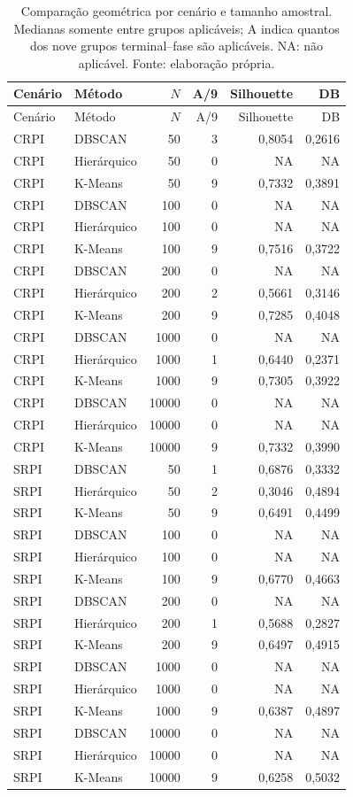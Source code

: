 \begingroup\small
\setlength{\LTpre}{0pt}
\begin{longtable}{llrrrr}
\caption{Comparação geométrica por cenário e tamanho amostral. Medianas somente entre grupos aplicáveis; A indica quantos dos nove grupos terminal--fase são aplicáveis. NA: não aplicável. Fonte: elaboração própria.}\label{tab:cluster-summary}\\
\hline Cenário & Método & $N$ & A/9 & Silhouette & DB \\
\hline\endfirsthead
\hline Cenário & Método & $N$ & A/9 & Silhouette & DB \\
\hline\endhead
CRPI & DBSCAN & 50 & 3 & 0,8054 & 0,2616 \\
CRPI & Hierárquico & 50 & 0 & NA & NA \\
CRPI & K-Means & 50 & 9 & 0,7332 & 0,3891 \\
CRPI & DBSCAN & 100 & 0 & NA & NA \\
CRPI & Hierárquico & 100 & 0 & NA & NA \\
CRPI & K-Means & 100 & 9 & 0,7516 & 0,3722 \\
CRPI & DBSCAN & 200 & 0 & NA & NA \\
CRPI & Hierárquico & 200 & 2 & 0,5661 & 0,3146 \\
CRPI & K-Means & 200 & 9 & 0,7285 & 0,4048 \\
CRPI & DBSCAN & 1000 & 0 & NA & NA \\
CRPI & Hierárquico & 1000 & 1 & 0,6440 & 0,2371 \\
CRPI & K-Means & 1000 & 9 & 0,7305 & 0,3922 \\
CRPI & DBSCAN & 10000 & 0 & NA & NA \\
CRPI & Hierárquico & 10000 & 0 & NA & NA \\
CRPI & K-Means & 10000 & 9 & 0,7332 & 0,3990 \\
SRPI & DBSCAN & 50 & 1 & 0,6876 & 0,3332 \\
SRPI & Hierárquico & 50 & 2 & 0,3046 & 0,4894 \\
SRPI & K-Means & 50 & 9 & 0,6491 & 0,4499 \\
SRPI & DBSCAN & 100 & 0 & NA & NA \\
SRPI & Hierárquico & 100 & 0 & NA & NA \\
SRPI & K-Means & 100 & 9 & 0,6770 & 0,4663 \\
SRPI & DBSCAN & 200 & 0 & NA & NA \\
SRPI & Hierárquico & 200 & 1 & 0,5688 & 0,2827 \\
SRPI & K-Means & 200 & 9 & 0,6497 & 0,4915 \\
SRPI & DBSCAN & 1000 & 0 & NA & NA \\
SRPI & Hierárquico & 1000 & 0 & NA & NA \\
SRPI & K-Means & 1000 & 9 & 0,6387 & 0,4897 \\
SRPI & DBSCAN & 10000 & 0 & NA & NA \\
SRPI & Hierárquico & 10000 & 0 & NA & NA \\
SRPI & K-Means & 10000 & 9 & 0,6258 & 0,5032 \\
\hline
\end{longtable}
\endgroup
